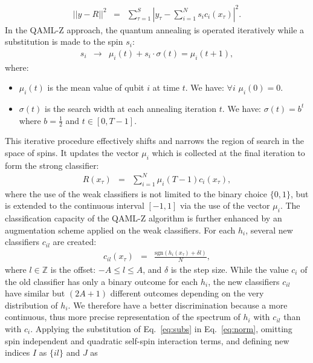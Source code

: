 \documentclass{article}
\begin{document}
\begin{eqnarray}
  || y - R ||^2 & = & \sum\limits_{\tau=1}^{S} |y_{\tau} - \sum\limits_{i=1}^{N} s_i c_i(x_{\tau})|^2.
\label{eq:norm}
\end{eqnarray}
In the QAML-Z approach, the quantum annealing is operated iteratively 
while a substitution is made to the spin $s_i$:
\begin{eqnarray}
s_i & \longrightarrow & \mu_i(t) + s_i \cdot \sigma(t) = \mu_i(t+1),
\label{eq:subs}
\end{eqnarray}
where:
\begin{itemize}
\item $\mu_i(t)$ is the mean value of qubit $i$ at time $t$. We have: 
$\forall i$ $\mu_i(0)=0$.
\item $\sigma(t)$ is the search width at each annealing iteration $t$. We 
have: $\sigma(t)=b^t$ where $b=\frac{1}{2}$ and $t \in [0,T-1]$.
\end{itemize}
This iterative procedure effectively shifts and narrows the region of 
search in the space of spins. It updates the vector $\mu_i$ which is 
collected at the final iteration to form the strong classifier:
\begin{eqnarray}
  R(x_{\tau}) & = & \sum\limits_{i=1}^{N} \mu_i(T - 1) c_i(x_{\tau}),
\label{eq:R}
\end{eqnarray}
where the use of the weak classifiers is not limited to the binary choice 
$\{0,1\}$, but is extended to the continuous interval $[-1,1]$ via the use 
of the vector $\mu_i$. The classification capacity of the QAML-Z algorithm is 
further enhanced by an augmentation scheme applied on the weak 
classifiers. For each $h_i$, several new classifiers $c_{il}$ are created:
\begin{eqnarray}
  c_{il}(x_{\tau}) & = & \frac{\mathrm{sgn}(h_i(x_{\tau}) + \delta l)}{N} ,
\label{eq:aug}
\end{eqnarray}
where $l \in \mathbb{Z}$ is the offset: $-A \leq l \leq A$, and $\delta$ 
is the step size. While the value $c_i$ of the old classifier has only a 
binary outcome for each $h_i$, the new classifiers $c_{il}$ have similar 
but $(2A+1)$ different outcomes depending on the very distribution of 
$h_i$. We therefore have a better discrimination because a more 
continuous, thus more precise representation of the spectrum of $h_i$ with 
$c_{il}$ than with $c_i$. Applying the substitution of Eq.~\ref{eq:subs} 
in Eq.~\ref{eq:norm}, omitting spin independent and quadratic self-spin 
interaction terms, and defining new indices $I$ as $\{il\}$ and $J$ as 
\end{document}
